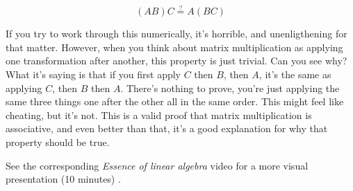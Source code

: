\begin{equation*}
  (AB)C \stackrel{?}{=} A(BC)
\end{equation*}

If you try to work through this numerically, it's horrible, and unenligthening
for that matter. However, when you think about matrix multiplication as applying
one transformation after another, this property is just trivial. Can you see
why? What it's saying is that if you first apply $C$ then $B$, then $A$, it's
the same as applying $C$, then $B$ then $A$. There's nothing to prove, you're
just applying the same three things one after the other all in the same order.
This might feel like cheating, but it's not. This is a valid proof that matrix
multiplication is associative, and even better than that, it's a good
explanation for why that property should be true.

\begin{remark}
  See the corresponding \textit{Essence of linear algebra} video for a more
  visual presentation (10 minutes)
  \cite{bib:linalg_matrix_multiplication_as_composition}.
\end{remark}
